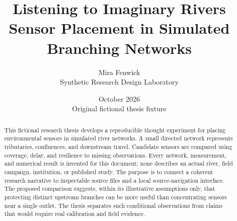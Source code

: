 \documentclass[11pt]{report}
\title{Listening to Imaginary Rivers\\Sensor Placement in Simulated Branching Networks}
\author{Mira Fenwick\\Synthetic Research Design Laboratory}
\date{October 2026\\Original fictional thesis fixture}
\begin{document}
\maketitle
\begin{abstract}
This fictional research thesis develops a reproducible thought experiment for placing environmental sensors in simulated river networks. A small directed network represents tributaries, confluences, and downstream travel. Candidate sensors are compared using coverage, delay, and resilience to missing observations. Every network, measurement, and numerical result is invented for this document; none describes an actual river, field campaign, institution, or published study. The purpose is to connect a coherent research narrative to inspectable source files and a local source-navigation interface. The proposed comparison suggests, within its illustrative assumptions only, that protecting distinct upstream branches can be more useful than concentrating sensors near a single outlet. The thesis separates such conditional observations from claims that would require real calibration and field evidence.
\end{abstract}
\tableofcontents
\listoffigures
\listoftables






\appendix

\end{document}
